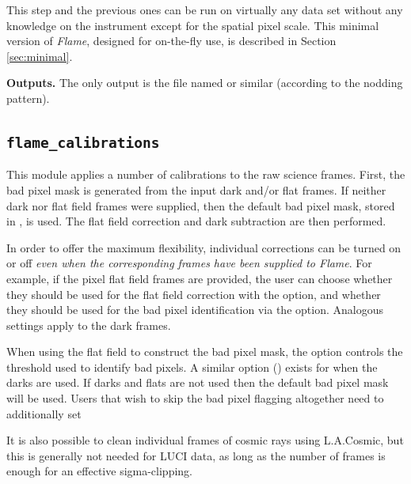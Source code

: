 \documentclass[a4paper]{article}
\newcommand{\flame}{\emph{Flame}}
\begin{document}
\begin{sloppypar}
This step and the previous ones can be run on virtually any data set without any knowledge on the instrument except for the spatial pixel scale. This minimal version of \flame, designed for on-the-fly use, is described in Section \ref{sec:minimal}.

\medskip
\noindent
\textbf{Outputs.} The only output is the file named  or similar (according to the nodding pattern).


\subsection{\texttt{flame\_calibrations}}
\label{sec:calibrations}

This module applies a number of calibrations to the raw science frames. First, the bad pixel mask is generated from the input dark and/or flat frames. If neither dark nor flat field frames were supplied, then the default bad pixel mask, stored in , is used. The flat field correction and dark subtraction are then performed.

In order to offer the maximum flexibility, individual corrections can be turned on or off \emph{even when the corresponding frames have been supplied to \flame}. For example, if the pixel flat field frames are provided, the user can choose whether they should be used for the flat field correction with the  option, and whether they should be used for the bad pixel identification via the  option. Analogous settings apply to the dark frames.

When using the flat field to construct the bad pixel mask, the option  controls the threshold used to identify bad pixels. A similar option () exists for when the darks are used. If darks and flats are not used then the default bad pixel mask will be used. Users that wish to skip the bad pixel flagging altogether need to additionally set 

It is also possible to clean individual frames of cosmic rays using L.A.Cosmic, but this is generally not needed for LUCI data, as long as the number of frames is enough for an effective sigma-clipping.


\end{sloppypar}
\end{document}
